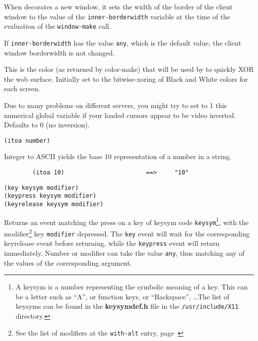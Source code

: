         

When {\GWM} decorates a new window, it sets the width of the border of the
client window to the value of the \verb"inner-borderwidth" variable at the
time of the evaluation of the \verb"window-make" call.

If \verb"inner-borderwidth" has the value \verb"any", which is the default
value, the client window borderwidth is not changed.

        

This is the color (as returned by color-make) that will be used by 
 to quickly XOR the wob surface.
Initially set to the bitwise-xoring of Black and White colors for each
screen.

        

Due to many problems on different servers, you might try to set to 1 this
numerical global variable if your loaded cursors appear to be video
inverted. Defaults to 0 (no inversion).

        
{\usagefont\begin{verbatim}
(itoa number)
\end{verbatim}}\usageupspace

Integer to ASCII yields the base 10 representation of a number in a {\WOOL}
string.

{\exemplefont\begin{verbatim}
        (itoa 10)                       ==>     "10"
\end{verbatim}}

        
{\usagefont\begin{verbatim}
(key keysym modifier)
(keypress keysym modifier)
(keyrelease keysym modifier)
\end{verbatim}}\usageupspace

Returns an event matching the press on a key of keysym code
\verb"keysym"\footnote{A keysym is a number representing the symbolic
meaning of a key. This can be a letter such as ``A'', or function keys, or
``Backspace'', \ldots The list of keysyms can be found in the {\bf keysymdef.h}
file in the {\tt /usr/include/X11} directory.}, with the
modifier\footnote{See the list of modifiers at the \verb"with-alt" entry,
page~\pageref{with-alt}} key {\tt modifier} depressed. The \verb"key" event
will wait for the corresponding keyrelease event before returning, while the
\verb"keypress" event will return immediately. Number or modifier can take
the value \verb"any", thus matching any of the values of the corresponding
argument.

